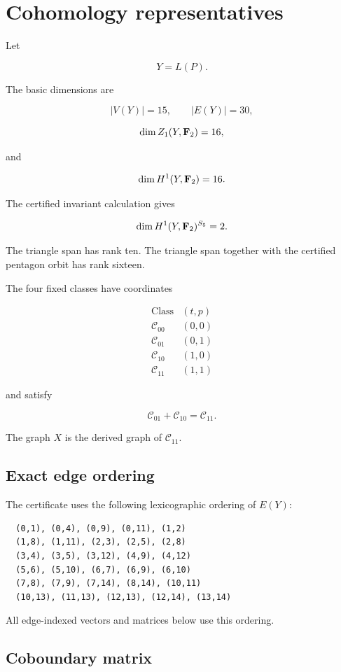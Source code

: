 \section{Cohomology representatives}

Let

\[
Y=L(P).
\]

The basic dimensions are

\[
|V(Y)|=15,
\qquad
|E(Y)|=30,
\]

\[
\dim Z_1(Y,\mathbf F_2)=16,
\]

and

\[
\dim H^1(Y,\mathbf F_2)=16.
\]

The certified invariant calculation gives

\[
\dim H^1(Y,\mathbf F_2)^{S_5}=2.
\]

The triangle span has rank ten. The triangle span together with the
certified pentagon orbit has rank sixteen.

The four fixed classes have coordinates

\[
\begin{array}{c|c}
\text{Class} & (t,p)\\
\hline
\mathcal C_{00} & (0,0)\\
\mathcal C_{01} & (0,1)\\
\mathcal C_{10} & (1,0)\\
\mathcal C_{11} & (1,1)
\end{array}
\]

and satisfy

\[
\mathcal C_{01}+\mathcal C_{10}
=
\mathcal C_{11}.
\]

The graph \(X\) is the derived graph of \(\mathcal C_{11}\).

\subsection{Exact edge ordering}

The certificate uses the following lexicographic ordering of
\(E(Y)\):

\begin{verbatim}
  (0,1), (0,4), (0,9), (0,11), (1,2)
  (1,8), (1,11), (2,3), (2,5), (2,8)
  (3,4), (3,5), (3,12), (4,9), (4,12)
  (5,6), (5,10), (6,7), (6,9), (6,10)
  (7,8), (7,9), (7,14), (8,14), (10,11)
  (10,13), (11,13), (12,13), (12,14), (13,14)
\end{verbatim}

All edge-indexed vectors and matrices below use this ordering.

\subsection{Coboundary matrix}

